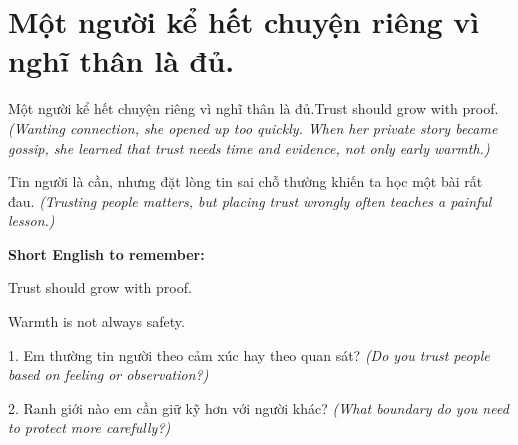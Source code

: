 \section{Một người kể hết chuyện riêng vì nghĩ thân là đủ.}
\begin{truyen}{Một người kể hết chuyện riêng vì nghĩ thân là đủ.}{Trust should grow with proof.}
\textit{(Wanting connection, she opened up too quickly. When her private story became gossip, she learned that trust needs time and evidence, not only early warmth.)}
\end{truyen}
\begin{baihoc}
Tin người là cần, nhưng đặt lòng tin sai chỗ thường khiến ta học một bài rất đau.
\textit{(Trusting people matters, but placing trust wrongly often teaches a painful lesson.)}
\end{baihoc}
\begin{ghinhoanh}
\textbf{Short English to remember:}

Trust should grow with proof.

Warmth is not always safety.
\end{ghinhoanh}
\begin{tuhocnhanh}
1. Em thường tin người theo cảm xúc hay theo quan sát? \textit{(Do you trust people based on feeling or observation?)}

2. Ranh giới nào em cần giữ kỹ hơn với người khác? \textit{(What boundary do you need to protect more carefully?)}
\end{tuhocnhanh}
\ngancach

